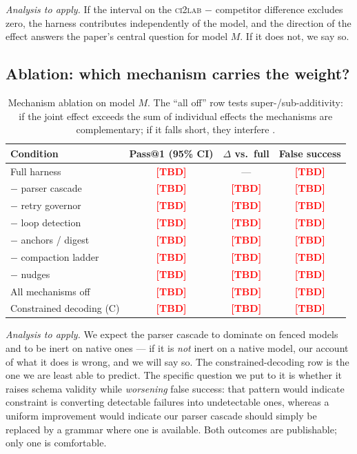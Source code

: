 \documentclass[11pt,a4paper]{article}
\newcommand{\tbd}{\textcolor{red}{\textbf{[TBD]}}}
\begin{document}
\noindent\emph{Analysis to apply.} If the interval on the \textsc{ci2lab}
$-$ competitor difference excludes zero, the harness contributes independently of
the model, and the direction of the effect answers the paper's central question
for model $M$. If it does not, we say so.

\subsection{Ablation: which mechanism carries the weight?}

\begin{table}[h]
\centering
\small
\begin{tabular}{@{}lccc@{}}
\toprule
\textbf{Condition} & \textbf{Pass@1 (95\% CI)} & \textbf{$\Delta$ vs.\ full} &
\textbf{False success} \\
\midrule
Full harness              & \tbd & --- & \tbd \\
$-$ parser cascade        & \tbd & \tbd & \tbd \\
$-$ retry governor        & \tbd & \tbd & \tbd \\
$-$ loop detection        & \tbd & \tbd & \tbd \\
$-$ anchors / digest      & \tbd & \tbd & \tbd \\
$-$ compaction ladder     & \tbd & \tbd & \tbd \\
$-$ nudges                & \tbd & \tbd & \tbd \\
\midrule
All mechanisms off        & \tbd & \tbd & \tbd \\
Constrained decoding (C)  & \tbd & \tbd & \tbd \\
\bottomrule
\end{tabular}
\caption{Mechanism ablation on model $M$. The ``all off'' row tests
super-/sub-additivity: if the joint effect exceeds the sum of individual effects
the mechanisms are complementary; if it falls short, they interfere
\citep{liu2026moreisnotbetter}.}
\label{tab:ablation}
\end{table}

\noindent\emph{Analysis to apply.} We expect the parser cascade to dominate on
fenced models and to be inert on native ones --- if it is \emph{not} inert on a
native model, our account of what it does is wrong, and we will say so. The
constrained-decoding row is the one we are least able to predict. The specific
question we put to it is whether it raises schema validity while \emph{worsening}
false success: that pattern would indicate constraint is converting detectable
failures into undetectable ones, whereas a uniform improvement would indicate our
parser cascade should simply be replaced by a grammar where one is available.
Both outcomes are publishable; only one is comfortable.
\end{document}
